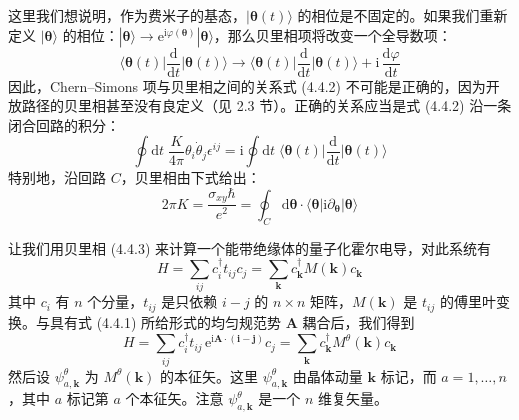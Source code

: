 这里我们想说明，作为费米子的基态，$|\pmb{\theta}(t)\rangle$ 的相位是不固定的。如果我们重新定义 $|\pmb{\theta}\rangle$ 的相位：$|\pmb{\theta}\rangle \to \mathrm{e}^{\mathrm{i}\varphi(\pmb{\theta})} |\pmb{\theta}\rangle$，那么贝里相项将改变一个全导数项：
\begin{equation*}
\Big\langle \pmb{\theta}(t) \Big| \frac{\mathrm{d}}{\mathrm{d}t} \Big| \pmb{\theta}(t) \Big\rangle \to \Big\langle \pmb{\theta}(t) \Big| \frac{\mathrm{d}}{\mathrm{d}t} \Big| \pmb{\theta}(t) \Big\rangle + \mathrm{i}\, \frac{\mathrm{d}\varphi}{\mathrm{d}t}
\end{equation*}
因此，Chern--Simons 项与贝里相之间的关系式 (4.4.2) 不可能是正确的，因为开放路径的贝里相甚至没有良定义（见 2.3 节）。正确的关系应当是式 (4.4.2) 沿一条闭合回路的积分：
\begin{equation*}
\oint \mathrm{d}t\; \frac{K}{4\pi} \theta_{i} \dot{\theta}_{j} \epsilon^{ij} = \mathrm{i} \oint \mathrm{d}t\; \Big\langle \pmb{\theta}(t) \Big| \frac{\mathrm{d}}{\mathrm{d}t} \Big| \pmb{\theta}(t) \Big\rangle
\end{equation*}
特别地，沿回路 $C$，贝里相由下式给出：
\begin{equation*}
2\pi K = \frac{\sigma_{xy} \hbar}{e^{2}} = \oint_{C} \mathrm{d}\pmb{\theta} \cdot \langle \pmb{\theta} | \mathrm{i} \partial_{\pmb{\theta}} | \pmb{\theta} \rangle \tag{4.4.3}
\end{equation*}

让我们用贝里相 (4.4.3) 来计算一个能带绝缘体的量子化霍尔电导，对此系统有
\begin{equation*}
H = \sum_{ij} c_{i}^{\dagger} t_{ij} c_{j} = \sum_{\pmb{k}} c_{\pmb{k}}^{\dagger} M(\pmb{k}) c_{\pmb{k}} \tag{4.4.4}
\end{equation*}
其中 $c_{i}$ 有 $n$ 个分量，$t_{ij}$ 是只依赖 $i - j$ 的 $n \times n$ 矩阵，$M(\pmb{k})$ 是 $t_{ij}$ 的傅里叶变换。与具有式 (4.4.1) 所给形式的均匀规范势 $\pmb{A}$ 耦合后，我们得到
\begin{equation*}
H = \sum_{ij} c_{i}^{\dagger} t_{ij}\, \mathrm{e}^{\mathrm{i}\pmb{A}\cdot(\pmb{i}-\pmb{j})} c_{j} = \sum_{\pmb{k}} c_{\pmb{k}}^{\dagger} M^{\theta}(\pmb{k}) c_{\pmb{k}}
\end{equation*}
然后设 $\psi^{\theta}_{a,\pmb{k}}$ 为 $M^{\theta}(\pmb{k})$ 的本征矢。这里 $\psi^{\theta}_{a,\pmb{k}}$ 由晶体动量 $\pmb{k}$ 标记，而 $a = 1, \dots, n$，其中 $a$ 标记第 $a$ 个本征矢。注意 $\psi^{\theta}_{a,\pmb{k}}$ 是一个 $n$ 维复矢量。

